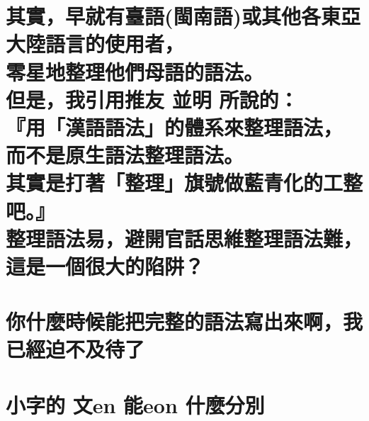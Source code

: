 \chapter[其實，早就有臺語(閩南語)或其他各東亞大陸語言的使用者， 零星地整理他們母語的語法。 但是，我引用推友 並明 所說的： 『用「漢語語法」的體系來整理語法， 而不是原生語法整理語法。 其實是打著「整理」旗號做藍青化的工整吧。』 整理語法易，避開官話思維整理語法難， 這是一個很大的陷阱？]{其實，早就有臺語(閩南語)或其他各東亞大陸語言的使用者， \\[0.35em] 零星地整理他們母語的語法。 \\[0.35em] 但是，我引用推友 並明 所說的： \\[0.35em] 『用「漢語語法」的體系來整理語法， \\[0.35em] 而不是原生語法整理語法。 \\[0.35em] 其實是打著「整理」旗號做藍青化的工整吧。』 \\[0.35em] 整理語法易，避開官話思維整理語法難， \\[0.35em] 這是一個很大的陷阱？}

\chapter[你什麼時候能把完整的語法寫出來啊，我已經迫不及待了]{你什麼時候能把完整的語法寫出來啊，我已經迫不及待了}

\chapter[小字的 文en 能eon 什麼分別]{小字的 文en 能eon 什麼分別}
